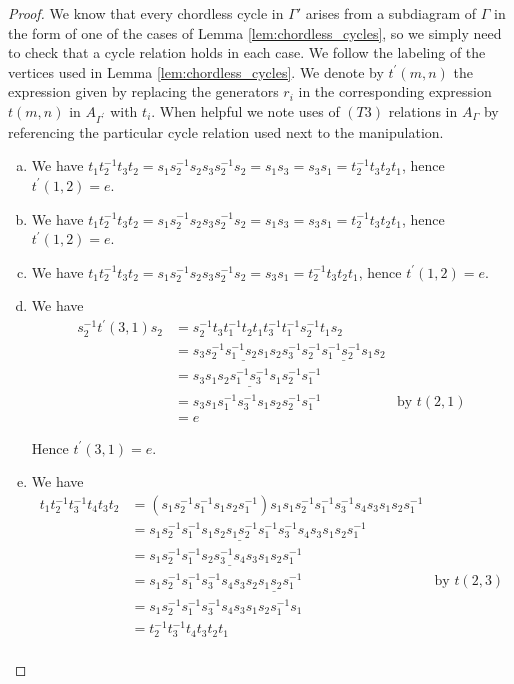 \documentclass[11pt]{amsart}
\theoremstyle{definition}
\begin{document}
\begin{proof}
We know that every chordless cycle in $\Gamma'$ arises from a subdiagram of $\Gamma$ in the form of one of the cases of Lemma \ref{lem:chordless_cycles}, so we simply need to check that a cycle relation holds in each case.  We follow the labeling of the vertices used in Lemma \ref{lem:chordless_cycles}.  We denote by $t^\prime(m,n)$ the expression given by replacing the generators $r_i$ in the corresponding expression $t(m,n)$ in $A_{\Gamma^\prime}$ with $t_i$.  When helpful we note uses of $(T3)$ relations in $A_\Gamma$ by referencing the particular cycle relation used next to the manipulation.

\begin{enumerate}[a)]
\item We have $t_1t_2^{-1}t_3t_2 = s_1s_2^{-1}s_2s_3s_2^{-1}s_2 = s_1s_3 = s_3s_1 = t_2^{-1}t_3t_2t_1$, hence $t^\prime(1,2) = e$.

\item We have $ t_1t_2^{-1}t_3t_2 = s_1s_2^{-1}s_2s_3s_2^{-1}s_2 = s_1s_3 = s_3s_1 = t_2^{-1}t_3t_2t_1$, hence $t^\prime(1,2) = e$.

\item We have $t_1t_2^{-1}t_3t_2 = s_1s_2^{-1}s_2s_3s_2^{-1}s_2 = s_3s_1 = t_2^{-1}t_3t_2t_1$, hence $t^\prime(1,2) = e$.

\item We have
\begin{align*}
s_2^{-1}t^\prime(3,1)s_2 &= s_2^{-1}t_3t_1^{-1}t_2t_1t_3^{-1}t_1^{-1}s_2^{-1}t_1s_2\\
&= s_3\underline{s_2^{-1}s_1^{-1}s_2s_1s_2}s_3^{-1}\underline{s_2^{-1}s_1^{-1}s_2^{-1}s_1s_2}\\
&= s_3s_1\underline{s_2s_1^{-1}s_3^{-1}s_1}s_2^{-1}s_1^{-1}\\
&= s_3s_1s_1^{-1}s_3^{-1}s_1s_2s_2^{-1}s_1^{-1} &\text{by } t(2,1)\\
&= e
\end{align*}

\noindent Hence $t^\prime(3,1) = e$.

\item We have
\begin{align*}
t_1t_2^{-1}t_3^{-1}t_4t_3t_2 &= (s_1s_2^{-1}s_1^{-1}s_1s_2s_1^{-1})s_1s_1s_2^{-1}s_1^{-1}s_3^{-1}s_4s_3s_1s_2s_1^{-1}\\
&= s_1s_2^{-1}s_1^{-1}\underline{s_1s_2s_1s_2^{-1}s_1^{-1}}s_3^{-1}s_4s_3s_1s_2s_1^{-1}\\
&= s_1s_2^{-1}s_1^{-1}\underline{s_2s_3^{-1}s_4s_3}s_1s_2s_1^{-1}\\
&= s_1s_2^{-1}s_1^{-1}s_3^{-1}s_4s_3\underline{s_2s_1s_2s_1^{-1}} &\text{by } t(2,3)\\
&= s_1s_2^{-1}s_1^{-1}s_3^{-1}s_4s_3s_1s_2s_1^{-1}s_1\\
&= t_2^{-1}t_3^{-1}t_4t_3t_2t_1\\
\end{align*}


\end{enumerate}
\end{proof}
\end{document}
